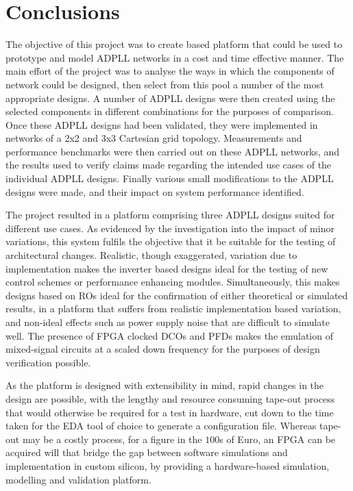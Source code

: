 \section{Conclusions}
The objective of this project was to create  based platform that could be used to prototype and model \acs{ADPLL} networks in a cost and time effective manner. The main effort of the project was to analyse the ways in which the components of  network could be designed, then select from this pool a number of the most appropriate designs. A number of \acs{ADPLL} designs were then created using the selected components in different combinations for the purposes of comparison. Once these \acs{ADPLL} designs had been validated, they were implemented in networks of a 2x2 and 3x3 Cartesian grid topology. Measurements and performance benchmarks were then carried out on these \acs{ADPLL} networks, and the results used to verify claims made regarding the intended use cases of the individual \acs{ADPLL} designs. Finally various small modifications to the \acs{ADPLL} designs were made, and their impact on system performance identified.

The project resulted in a platform comprising three \acs{ADPLL} designs suited for different use cases. As evidenced by the investigation into the impact of minor variations, this system fulfils the objective that it be suitable for the testing of architectural changes. Realistic, though exaggerated, variation due to implementation makes the inverter based designs ideal for the testing of new control schemes or performance enhancing modules. Simultaneously, this makes designs based on \acsp{RO}   ideal for the confirmation of either theoretical or simulated results, in a platform that suffers from realistic implementation based variation, and non-ideal effects such as power supply noise that are difficult to simulate well. The presence of \acs{FPGA} clocked \acsp{DCO} and \acsp{PFD} makes the emulation of mixed-signal circuits at a scaled down frequency for the purposes of design verification possible.

As the platform is designed with extensibility in mind, rapid changes in the design are possible, with the lengthy and resource consuming tape-out process that would otherwise be required for a test in hardware, cut down to the time taken for the \ac{EDA} tool of choice to generate a configuration file. Whereas tape-out may be a costly process, for a figure in the $100$s of Euro, an \acs{FPGA} can be acquired will that bridge the gap between software simulations and implementation in custom silicon, by providing a hardware-based simulation, modelling and validation platform.

